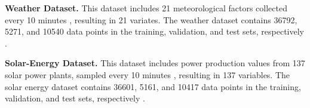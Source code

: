 \textbf{Weather Dataset.} This dataset includes 21 meteorological factors collected every 10 minutes \cite{wu2021autoformer}, resulting in 21 variates. The weather dataset contains 36792, 5271, and 10540 data points in the training, validation, and test sets, respectively \cite{liu2023itransformer}.

\textbf{Solar-Energy Dataset.} This dataset includes power production values from 137 solar power plants, sampled every 10 minutes \cite{LSTNet}, resulting in 137 variables. The solar energy dataset contains 36601, 5161, and 10417 data points in the training, validation, and test sets, respectively \cite{liu2023itransformer}.  